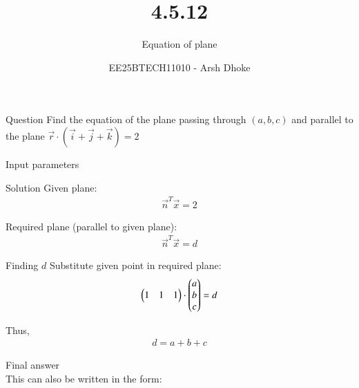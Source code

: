 \documentclass{beamer}
\title{4.5.12}
\subtitle{Equation of plane}
\author{EE25BTECH11010 - Arsh Dhoke}
\date{}
\begin{document}
\begin{frame}
  \titlepage
\end{frame}


\begin{frame}{Question}
Find the equation of the plane passing through 
$(a,b,c)$ and parallel to the plane $\vec{r}\cdot(\vec{i}+\vec{j}+\vec{k})=2$
\end{frame}
\begin{frame}{Input parameters}

\end{frame}
\begin{frame}{Solution}
Given plane:
\begin{align}
\vec{n}^T \vec{x} = 2
\end{align}

Required plane (parallel to given plane):
\begin{align}
\vec{n}^T \vec{x}=d
\end{align}
\end{frame}

\begin{frame}{Finding $d$}
Substitute given point in required plane:
\begin{align}
\begin{pmatrix}1&1&1\end{pmatrix}\cdot\begin{pmatrix}a\\b\\c\end{pmatrix}=d
\end{align}

Thus,
\begin{align}
d=a+b+c
\end{align}
\end{frame}

\begin{frame}{Final answer}
 \\

This can also be written in the form:
    
\end{frame}
\end{document}
